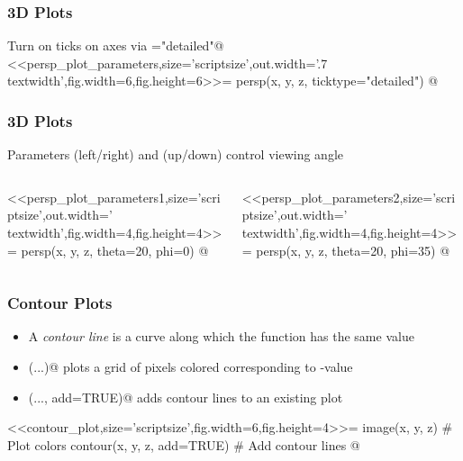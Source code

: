\documentclass[%
  final,
  11pt, 
  show notes, %
  t, %
  fleqn, %
]{beamer}
\begin{document}
\begin{frame}[fragile]
  \frametitle{3D Plots}
Turn on ticks on axes via \verb@ticktype="detailed"@
<<persp_plot_parameters,size='scriptsize',out.width='.7\\textwidth',fig.width=6,fig.height=6>>=
persp(x, y, z, ticktype="detailed")
@
\end{frame}

\begin{frame}[fragile]
  \frametitle{3D Plots}
Parameters \verb@theta@ (left/right) and \verb@phi@ (up/down) control viewing angle
\begin{columns}[T]
\begin{column}{.45\textwidth}
<<persp_plot_parameters1,size='scriptsize',out.width='\\textwidth',fig.width=4,fig.height=4>>=
persp(x, y, z, theta=20, phi=0)
@
\end{column}
\begin{column}{.45\textwidth}
<<persp_plot_parameters2,size='scriptsize',out.width='\\textwidth',fig.width=4,fig.height=4>>=
persp(x, y, z, theta=20, phi=35)
@
\end{column}
\end{columns}
\end{frame}

\begin{frame}[fragile]
  \frametitle{Contour Plots}
\begin{itemize}
\item A \emph{contour line} is a curve along which the function has the same value
\item \verb@image(...)@ plots a grid of pixels colored corresponding to \verb@z@-value
\item \verb@contour(..., add=TRUE)@ adds contour lines to an existing plot
\end{itemize}
<<contour_plot,size='scriptsize',fig.width=6,fig.height=4>>=
image(x, y, z) # Plot colors
contour(x, y, z, add=TRUE) # Add contour lines
@
\end{frame}
\end{document}

